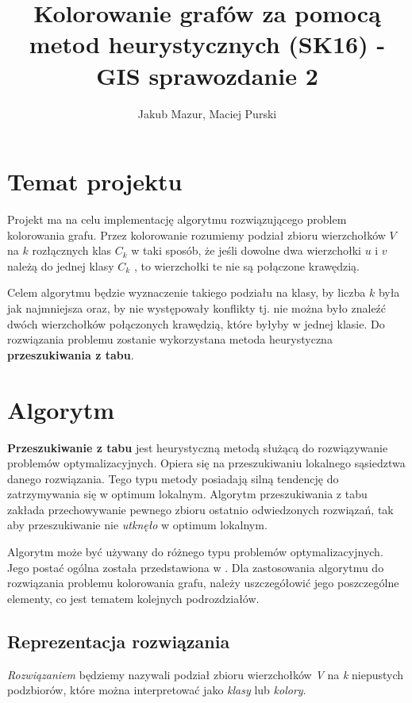\documentclass[12pt,a4paper]{article}
\author{Jakub Mazur, Maciej Purski}
\title{Kolorowanie grafów za pomocą metod heurystycznych (SK16) - GIS sprawozdanie 2}
\begin{document}
\maketitle

\section{Temat projektu}

\indent
Projekt ma na celu implementację algorytmu rozwiązującego problem kolorowania grafu.
Przez kolorowanie rozumiemy podział zbioru wierzchołków $V$ na $k$ rozłącznych klas $C_k$ w taki
sposób, że jeśli dowolne dwa wierzchołki $u$ i $v$ należą do jednej klasy $C_k$ , to wierzchołki te nie
są połączone krawędzią.

Celem algorytmu będzie wyznaczenie takiego podziału na klasy, by liczba $k$ była jak
najmniejsza oraz, by nie występowały konflikty tj. nie można było znaleźć dwóch wierzchołków
połączonych krawędzią, które byłyby w jednej klasie.
Do rozwiązania problemu zostanie wykorzystana metoda heurystyczna \textbf{przeszukiwania z tabu}.

\section{Algorytm}

\textbf{Przeszukiwanie z tabu} jest heurystyczną metodą służącą do rozwiązywanie problemów optymalizacyjnych. Opiera się na przeszukiwaniu lokalnego sąsiedztwa danego rozwiązania. Tego typu metody posiadają silną tendencję do zatrzymywania się w optimum lokalnym. Algorytm przeszukiwania z tabu zakłada przechowywanie pewnego zbioru ostatnio odwiedzonych rozwiązań, tak aby przeszukiwanie nie \textit{utknęło} w optimum lokalnym.

Algorytm może być używany do różnego typu problemów optymalizacyjnych. Jego postać ogólna została przedstawiona w \cite{alhe-tabu}. Dla zastosowania algorytmu do rozwiązania problemu kolorowania grafu, należy uszczegółowić jego poszczególne elementy, co jest tematem kolejnych podrozdziałów.

\subsection{Reprezentacja rozwiązania}
\textit{Rozwiązaniem} będziemy nazywali podział zbioru wierzchołków \textit{V} na \textit{k} niepustych podzbiorów, które można interpretować jako \textit{klasy} lub \textit{kolory}.
\end{document}
